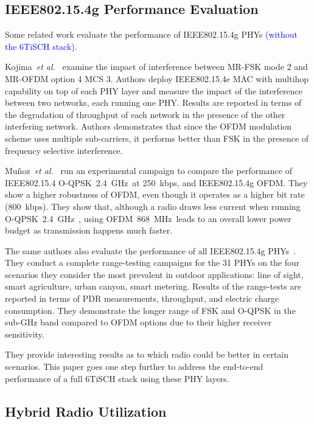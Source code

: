 \documentclass[sensors,article,submit,moreauthors,pdftex]{Definitions/mdpi}
\newcommand{\oqpsk}         {O-QPSK~2.4~GHz}
\newcommand{\ofdm}          {OFDM~868~MHz}
\newcommand{\etal}          {\textit{et al.}}
\newcommand{\update}[1]     {\textcolor{blue}{#1}}
\begin{document}
\subsection{IEEE802.15.4g Performance Evaluation}
\label{sec:related_4g}

Some related work evaluate the performance of IEEE802.15.4g PHYs \update{(without the 6TiSCH stack)}.

Kojima~\etal~\cite{kojima15system} examine the impact of interference between MR-FSK mode 2 and MR-OFDM option 4 MCS 3. 
Authors deploy IEEE802.15.4e MAC with multihop capability on top of each PHY layer and measure the impact of the interference between two networks, each running one PHY.
Results are reported in terms of the degradation of throughput of each network in the presence of the other interfering network.
Authors demonstrates that since the OFDM modulation scheme uses multiple sub-carriers, it performs better than FSK in the presence of frequency selective interference. 

Mu\~noz~\etal~\cite{munoz18overview} run an experimental campaign to compare the performance of
    IEEE802.15.4 \oqpsk\ at 250~kbps, and
    IEEE802.15.4g OFDM.
They show a higher robustness of OFDM, even though it operates as a higher bit rate (800~kbps).
They show that, although a radio draws less current when running \oqpsk\ , using \ofdm\ leads to an overall lower power budget as transmission happens much faster.

The same authors also evaluate the performance of all IEEE802.15.4g PHYs~\cite{munoz18evaluation}.
They conduct a complete range-testing campaigns for the 31 PHYs on the four scenarios they consider the most prevalent in outdoor applications:
    line of sight,
    smart agriculture,
    urban canyon,
    smart metering. 
Results of the range-tests are reported in terms of PDR measurements, throughput, and electric charge consumption.
They demonstrate the longer range of FSK and O-QPSK in the sub-GHz band compared to OFDM options due to their higher receiver sensitivity.

They provide interesting results as to which radio could be better in certain scenarios.
This paper goes one step further to address the end-to-end performance of a full 6TiSCH stack using these PHY layers.

\subsection{Hybrid Radio Utilization}
\label{sec:related_hybrid}
\end{document}
